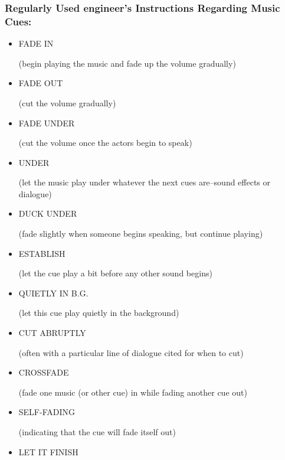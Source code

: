 \documentclass[openleft,oneside,showtrims]{memoir}
\begin{document}
\subsubsection*{Regularly Used engineer's Instructions Regarding Music Cues:}
\label{sec:org71e52c4}

\begin{itemize}
\item FADE IN
\label{sec:org2c51337}

(begin playing the music and fade up the volume gradually)

\item FADE OUT
\label{sec:orge109284}

(cut the volume gradually)

\item FADE UNDER
\label{sec:org0d392a3}

(cut the volume once the actors begin to speak)

\item UNDER
\label{sec:org1c3fc09}

(let the music play under whatever the next cues are--sound effects or dialogue)

\item DUCK UNDER
\label{sec:orgd8d920d}

(fade slightly when someone begins speaking, but continue playing) 

\item ESTABLISH
\label{sec:org6b29764}

(let the cue play a bit before any other sound begins) 

\item QUIETLY IN B.G.
\label{sec:org359387c}

(let this cue play quietly in the background) 

\item CUT ABRUPTLY
\label{sec:org8646eeb}

(often with a particular line of dialogue cited for when to cut)

\item CROSSFADE
\label{sec:org8d3b0d0}

(fade one music (or other cue) in while fading another cue out) 

\item SELF-FADING
\label{sec:orgd6ff418}

(indicating that the cue will fade itself out)

\item LET IT FINISH
\label{sec:orgf9fac7d}


\end{itemize}
\end{document}
